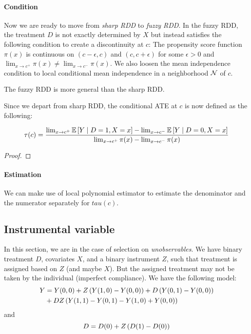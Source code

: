 \paragraph{Condition}
Now we are ready to move from \emph{sharp RDD} to \emph{fuzzy RDD}. In the fuzzy RDD, the treatment $D$ is not exactly determined by $X$ but instead satisfies the following condition to create a discontinuity at $c$:
The propensity score function $\pi(x)$ is continuous on $(c-\epsilon,c)$ and $(c,c+\epsilon)$ for some $\epsilon>0$ and $\lim_{x\to c^+}\pi(x)\neq \lim_{x\to c^-}\pi(x)$.
We also loosen the mean independence condition to local conditional mean independence in a neighborhood $\mathcal{N}$ of $c$.
\begin{remark}
    The fuzzy RDD is more general than the sharp RDD. 
\end{remark}
Since we depart from sharp RDD, the conditional ATE at $c$ is now defined as the following:
\begin{proposition}\begin{equation*}
    \tau(c) = \frac{\lim_{x\to c^+}\mathbb{E}\left[Y\mid D=1,X=x\right]-\lim_{x\to c^-}\mathbb{E}\left[Y\mid D=0,X=x\right]}{\lim_{x\to c^+}\pi(x)-\lim_{x\to c^-}\pi(x)}
\end{equation*}
\end{proposition}
\begin{proof}
    
\end{proof}
\paragraph{Estimation}
We can make use of local polynomial estimator to estimate the denominator and the numerator separately for $tau(c)$.


\subsection{Instrumental variable}

In this section, we are in the case of selection on \emph{unobservables}. We have binary treatment $D$, covariates $X$, and a binary instrument $Z$, such that treatment is assigned based on $Z$ (and maybe $X$). But the assigned treatment may not be taken by the individual (imperfect compliance). We have the following model:
\begin{equation}
    \begin{split}
        Y &= Y(0,0)+Z\left(Y(1,0)-Y(0,0)\right)+D\left(Y(0,1)-Y(0,0)\right) \\
        &+ DZ\left(Y(1,1)-Y(0,1)-Y(1,0)+Y(0,0)\right)
    \end{split}
\end{equation}
and \begin{equation}
    D=D(0)+Z\left(D(1)-D(0)\right)
\end{equation}
